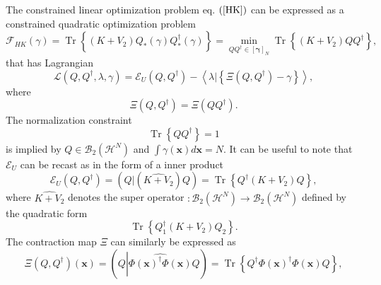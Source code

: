 \documentclass[aps,preprint]{revtex4}%
\begin{document}
The constrained linear optimization problem eq. $\left(  \ref{HK}\right)  $
can be expressed as a constrained quadratic optimization problem
\begin{equation}
\mathcal{F}_{HK}\left(  \gamma\right)  =\operatorname{Tr}\left\{  \overset
{}{\left(  K+V_{2}\right)  Q_{\ast}\left(  \gamma\right)  Q_{\ast}^{\dagger
}\left(  \gamma\right)  }\right\}  =\min_{QQ^{\dagger}\in\left[
\mathbf{\gamma}\right]  _{N}}\operatorname{Tr}\left\{  \overset{}{\left(
K+V_{2}\right)  QQ^{\dagger}}\right\}  ,
\end{equation}
that has Lagrangian
\begin{equation}
\mathcal{L}\left(  Q,Q^{\dagger},\lambda,\gamma\right)  =\mathcal{E}%
_{U}\left(  Q,Q^{\dagger}\right)  -\left\langle \left.  \lambda\right\vert
\left\{  \Xi\left(  Q,Q^{\dagger}\right)  -\gamma\right\}  \right\rangle ,
\end{equation}
where
\begin{equation}
\Xi\left(  Q,Q^{\dagger}\right)  =\Xi\left(  QQ^{\dagger}\right)  .
\end{equation}
The normalization constraint
\begin{equation}
\operatorname{Tr}\left\{  QQ^{\dagger}\right\}  =1
\end{equation}
is implied by $Q\in\mathcal{B}_{2}\left(  \mathcal{H}^{N}\right)  $ and
$\int\gamma\left(  \mathbf{x}\right)  d\mathbf{x}=N.$ It can be useful to note
that $\mathcal{E}_{U}$ can be recast as in the form of a inner product
\begin{equation}
\mathcal{E}_{U}\left(  Q,Q^{\dagger}\right)  =\left(  \left.  Q\right\vert
\left(  \widehat{K+V_{2}}\right)  Q\right)  =\operatorname{Tr}\left\{
Q^{\dagger}\left(  K+V_{2}\right)  Q\right\}  ,
\end{equation}
where $\widehat{K+V_{2}}$ denotes the super operator $:\mathcal{B}_{2}\left(
\mathcal{H}^{N}\right)  \rightarrow\mathcal{B}_{2}\left(  \mathcal{H}%
^{N}\right)  $ defined by the quadratic form
\begin{equation}
\operatorname{Tr}\left\{  Q_{1}^{\dagger}\left(  K+V_{2}\right)
Q_{2}\right\}  .
\end{equation}
The contraction map $\Xi$ can similarly be expressed as
\begin{equation}
\Xi\left(  Q,Q^{\dagger}\right)  \left(  \mathbf{x}\right)  =\left(
Q\left\vert \widehat{\Phi\left(  \mathbf{x}\right)  ^{\dagger}\Phi\left(
\mathbf{x}\right)  }\right.  Q\right)  =\operatorname{Tr}\left\{  Q^{\dagger
}\Phi\left(  \mathbf{x}\right)  ^{\dagger}\Phi\left(  \mathbf{x}\right)
Q\right\}  ,
\end{equation}
\end{document}
